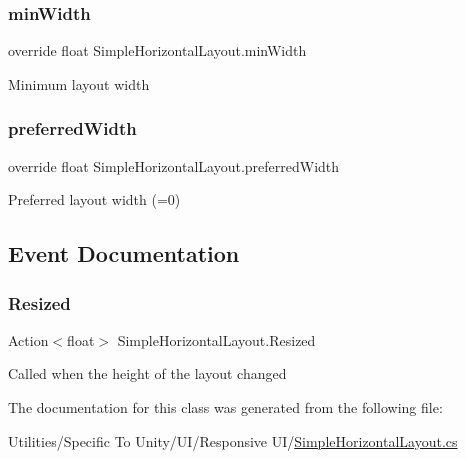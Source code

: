 \subsubsection{\texorpdfstring{min\+Width}{minWidth}}
{\footnotesize\ttfamily override float Simple\+Horizontal\+Layout.\+min\+Width\hspace{0.3cm}{\ttfamily [get]}}



Minimum layout width 

\mbox{\label{class_simple_horizontal_layout_ac248bb3c170c1e087fe1b347518c0a08}} 
\subsubsection{\texorpdfstring{preferred\+Width}{preferredWidth}}
{\footnotesize\ttfamily override float Simple\+Horizontal\+Layout.\+preferred\+Width\hspace{0.3cm}{\ttfamily [get]}}



Preferred layout width (=0) 



\subsection{Event Documentation}
\mbox{\label{class_simple_horizontal_layout_a75ae5219de178cf2a3329b74a7641649}} 
\subsubsection{\texorpdfstring{Resized}{Resized}}
{\footnotesize\ttfamily Action$<$float$>$ Simple\+Horizontal\+Layout.\+Resized}



Called when the height of the layout changed 



The documentation for this class was generated from the following file\+:\begin{DoxyCompactItemize}
\item 
Utilities/\+Specific To Unity/\+U\+I/\+Responsive U\+I/\hyperlink{_simple_horizontal_layout_8cs}{Simple\+Horizontal\+Layout.\+cs}\end{DoxyCompactItemize}

